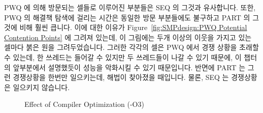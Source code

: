 PWQ 에 의해 방문되는 셀들로 이루어진 부분들은 SEQ 의 그것과 유사합니다.
또한, PWQ 의 해결책 탐색에 걸리는 시간은 동일한 방문 부분들에도 불구하고 PART
의 그것에 비해 훨씬 큽니다.
이에 대한 이유가 Figure~\ref{fig:SMPdesign:PWQ Potential Contention Points} 에
그려져 있는데, 이 그림에는 두개 이상의 이웃을 가지고 있는 셀마다 붉은 원을
그려두었습니다.
그러한 각각의 셀은 PWQ 에서 경쟁 상황을 초래할 수 있는데, 한 쓰레드는 들어갈 수
있지만 두 쓰레드들이 나갈 수 있기 때문에, 이 챕터의 앞부분에서 설명했듯이
성능을 악화시킬 수 있기 때문입니다.
반면에 PART 는 그런 경쟁상황을 한번만 일으키는데, 해법이 찾아졌을 때입니다.
물론, SEQ 는 경쟁상황은 일으키지 않습니다.

\begin{figure}[tb]
\centering
{}
\caption{Effect of Compiler Optimization (-O3)}
\label{fig:SMPdesign:Effect of Compiler Optimization (-O3)}
\end{figure}

